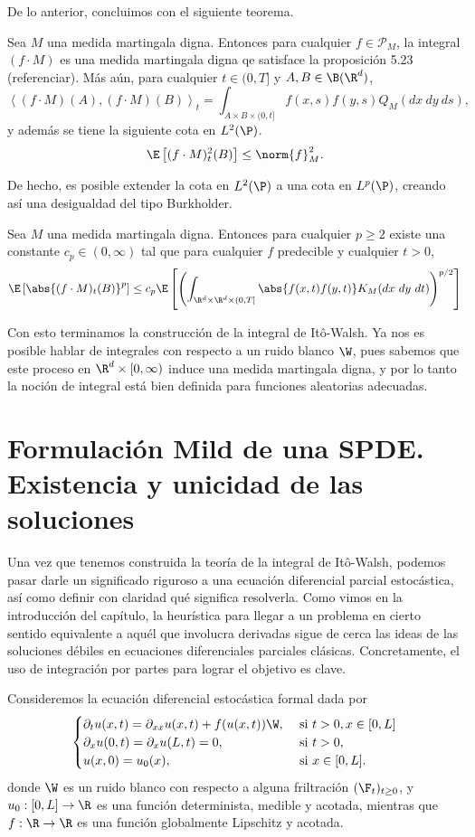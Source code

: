 De lo anterior, concluimos con el siguiente teorema.

\begin{teo} 
 Sea $M$ una medida martingala digna. Entonces para cualquier $f\in \mathscr{P}_M$, la integral $(f\cdot M)$ es una medida martingala digna qe satisface la proposición 5.23 (referenciar). Más aún, para cualquier $t\in (0,T]$ y $A,B\in \B(\R^{d})$, 
 \[
 \left\langle (f\cdot M)(A),(f\cdot M)(B)\right\rangle _t= \int_{A\times B\times (0,t]}f(x,s)f(y,s)Q_M(dx \ dy \ ds),
 \]
 y además se tiene la siguiente cota en $L^{2}(\P)$.
 \[
 \E\left[(f\cdot M)^{2}_t(B)\right] \leq \norm{f}_M^{2}.
 \]
 \end{teo}
 De hecho, es posible extender la cota en $L^2(\P)$ a una cota en $L^{p}(\P)$, creando así una desigualdad del tipo Burkholder.
 \begin{teo}
  Sea $M$ una medida martingala digna. Entonces para cualquier $p\geq2$ existe una constante $c_p\in (0,\infty)$ tal que para cualquier $f$ predecible y cualquier $t>0$, 
  \[
  \E\left[\abs{(f\cdot M)_t(B)}^p\right]\leq c_p \E\left[\left(\int_{\R^{d}\times \R^{d}\times (0,T]}\abs{f(x,t)f(y,t)}K_M(dx \ dy \ dt)\right)^{p/2}\right] 
  \]
  \end{teo}
  Con esto terminamos la construcción de la integral de Itô-Walsh. Ya nos es posible hablar de integrales con respecto a un ruido blanco $\W$, pues sabemos que este proceso en $\R^{d}\times [0,\infty)$ induce una medida martingala digna, y por lo tanto la noción de integral está bien definida para funciones aleatorias adecuadas. 

\section{Formulación Mild de una SPDE. Existencia y unicidad de las soluciones}
Una vez que tenemos construida la teoría de la integral de Itô-Walsh, podemos pasar darle un significado riguroso a una ecuación diferencial parcial estocástica, así como definir con claridad qué significa resolverla. Como vimos en la introducción del capítulo, la heurística para llegar a un problema en cierto sentido equivalente a aquél que involucra derivadas sigue de cerca las ideas de las soluciones débiles en ecuaciones diferenciales parciales clásicas. Concretamente, el uso de integración por partes para lograr el objetivo es clave. 

Consideremos la ecuación diferencial estocástica formal dada por 
\[
\begin{cases}
   \partial_tu(x,t)=\partial_{xx}u(x,t)+f(u(x,t))\W, & \text{ si } t>0, x\in [0,L]\\
   \partial_xu(0,t)=\partial_xu(L,t)=0, & \text{ si } t>0,\\
   u(x,0)=u_0(x), & \text{ si } x\in [0,L].\\
\end{cases}
\]
donde $\W$ es un ruido blanco con respecto a alguna friltración $(\F_t)_{t\geq0}$, y $u_0:[0,L]\to\R$ es una función determinista, medible y acotada, mientras que $f:\R\to\R$ es una función globalmente Lipschitz y acotada.

